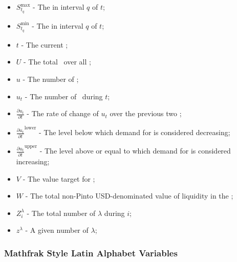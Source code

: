\documentclass[class=article, crop=false]{standalone}
\begin{document}
\begin{itemize}[topsep=0pt, itemsep=3pt,leftmargin=16pt]
    \item[] $S_{t_{q}}^{\text{max}}$ - The  in interval $q$ of $t$;
    \item[] $S_{t_{q}}^{\text{min}}$ - The  in interval $q$ of $t$;
    \item[] $t$ - The current ;
    \item[] $U$ - The total  \Pinto\ over all ;
    \item[] $u$ - The number of  \Pinto;
    \item[] $u_{t}$ - The number of  \Pinto\ during $t$;
    \item[] $\frac{\partial u_{t}}{\partial t}$ - The rate of change of $u_{t}$ over the previous two ;
    \item[] $\frac{\partial u_{t}}{\partial t}^{\text{lower}}$ - The level below which demand for  is considered decreasing;
    \item[] $\frac{\partial u_{t}}{\partial t}^{\text{upper}}$ - The level above or equal to which demand for  is considered increasing;
    \item[] $V$ - The value target for ;
    \item[] $W$ - The total non-Pinto USD-denominated value of liquidity in the ;
    \item[] $Z_{i}^{\lambda}$ - The total number of $\lambda$  during  $i$;
    \item[] $z^{\lambda}$ - A given number of  $\lambda$;
\end{itemize}


\subsubsection{Mathfrak Style Latin Alphabet Variables}
\end{document}
